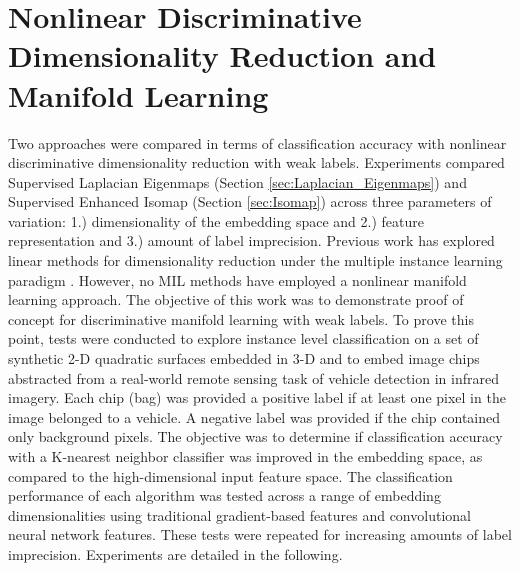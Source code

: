 \begin{comment}
	\caption[Image chip uncertainty]{Proposed positive image chips as denoted by the green and blue boxes.  The left image corresponds to a label uncertainty of 0, which is the canonical bounding box around the target.  The middle represents a random target chip of base size 51x121 and the right image is a proposed chip of label uncertainty 3, or 3 times the base chip.}
	\label{fig:chip_uncertainty}%
\end{figure*}
\end{comment}


\section{Nonlinear Discriminative Dimensionality Reduction and Manifold Learning}
Two approaches were compared in terms of classification accuracy with nonlinear discriminative dimensionality reduction with weak labels.  Experiments compared Supervised Laplacian Eigenmaps (Section \ref{sec:Laplacian_Eigenmaps}) and Supervised Enhanced Isomap (Section \ref{sec:Isomap})  across three parameters of variation: 1.) dimensionality of the embedding space and 2.) feature representation and 3.) amount of label imprecision.  Previous work has explored linear methods for dimensionality reduction under the multiple instance learning paradigm \citep{Sun2010MIDR, Ping2010MILDRMaxMargin, Kim2010LocalDRMIL}.  However, no MIL methods have employed a nonlinear manifold learning approach.  The objective of this work was to demonstrate proof of concept for discriminative manifold learning with weak labels.  To prove this point, tests were conducted to explore instance level classification on a set of synthetic 2-D quadratic surfaces embedded in 3-D and to embed image chips abstracted from a real-world remote sensing task of vehicle detection in infrared imagery.  Each chip (bag) was provided a positive label if at least one pixel in the image belonged to a vehicle.  A negative label was provided if the chip contained only background pixels.  The objective was to determine if classification accuracy with a K-nearest neighbor classifier was improved in the embedding space, as compared to the high-dimensional input feature space.  The classification performance of each algorithm was tested across a range of embedding dimensionalities using traditional gradient-based features and convolutional neural network features.  These tests were repeated for increasing amounts of label imprecision.  Experiments are detailed in the following.  

